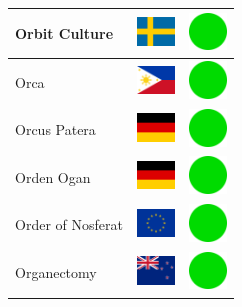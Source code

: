 \documentclass[12pt, a4paper, twoside]{report}
\begin{document}
\begin{center}
\begin{longtable}{|p{5cm}|p{2cm}|p{2cm}|}
 Orbit Culture                                              & \includegraphics[width=1cm]{../img/flags/se} &   \includegraphics[width=1cm]{../likes/y} \\ \hline
 Orca                                                       & \includegraphics[width=1cm]{../img/flags/ph} &   \includegraphics[width=1cm]{../likes/y} \\ \hline
 Orcus Patera                                               & \includegraphics[width=1cm]{../img/flags/de} &   \includegraphics[width=1cm]{../likes/y} \\ \hline
 Orden Ogan                                                 & \includegraphics[width=1cm]{../img/flags/de} &   \includegraphics[width=1cm]{../likes/y} \\ \hline
 Order of Nosferat                                          & \includegraphics[width=1cm]{../img/flags/eu} &   \includegraphics[width=1cm]{../likes/y} \\ \hline
 Organectomy                                                & \includegraphics[width=1cm]{../img/flags/nz} &   \includegraphics[width=1cm]{../likes/y} \\ \hline

\end{longtable}
\end{center}
\end{document}
